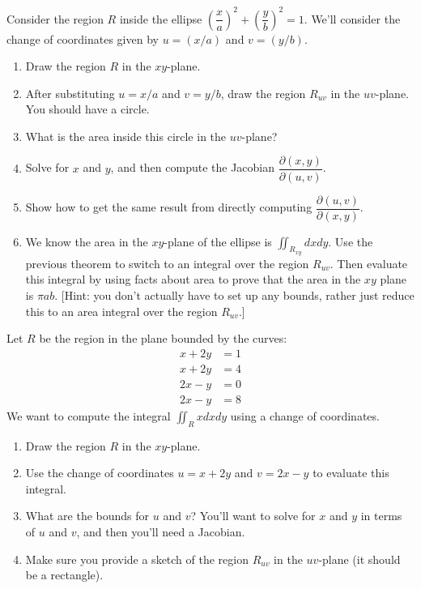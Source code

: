 \begin{problem}
 Consider the region $R$ inside the ellipse $\left(\dfrac{x}{a}\right)^2+\left(\dfrac{y}{b}\right)^2=1$.  We'll consider the change of coordinates given by $u=(x/a)$ and $v=(y/b)$.
\begin{enumerate}
	\item Draw the region $R$ in the $xy$-plane.  
	\item After substituting $u=x/a$ and $v=y/b$, draw the region $R_{uv}$ in the $uv$-plane.  You should have a circle.  
	\item What is the area inside this circle in the $uv$-plane?
	\item Solve for $x$ and $y$, and then compute the Jacobian  $\dfrac{\partial (x,y)}{\partial (u,v)}$. 
	\item Show how to get the same result from directly computing $\dfrac{\partial (u,v)}{\partial (x,y)}$.
	\item We know the area in the $xy$-plane of the ellipse is $\iint_{R_{xy}} dxdy$. Use the previous theorem to switch to an integral over the region $R_{uv}$.  Then evaluate this integral by using facts about area to prove that the area in the $xy$ plane is $\pi a b$. [Hint: you don't actually have to set up any bounds, rather just reduce this to an area integral over the region $R_{uv}$.] 
\end{enumerate}

\end{problem}


\begin{problem}
Let $R$ be the region in the plane bounded by the curves: 
\begin{align*}
	x+2y&=1\\
	x+2y&=4\\
	2x-y&=0\\
	2x-y&=8
\end{align*}
We want to compute the integral $\iint_R xdxdy$ using a change of coordinates. 

\begin{enumerate}
	\item Draw the region $R$ in the $xy$-plane. 
	\item Use the change of coordinates $u=x+2y$ and $v=2x-y$ to evaluate this integral. 
	\item What are the bounds for $u$ and $v$?  You'll want to solve for $x$ and $y$ in terms of $u$ and $v$, and then you'll need a Jacobian.
	\item Make sure you provide a sketch of the region $R_{uv}$ in the $uv$-plane (it should be a rectangle). 
\end{enumerate}
	
\end{problem}


